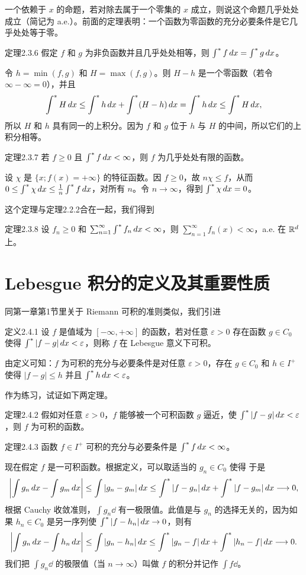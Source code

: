 一个依赖于 $x$ 的命题，若对除去属于一个零集的 $x$ 成立，则说这个命题几乎处处成立（简记为 a.e.）。前面的定理表明：一个函数为零函数的充分必要条件是它几乎处处等于零。
\begin{statement}{定理}{2.3.6}
假定 $f$ 和 $g$ 为非负函数并且几乎处处相等，则 $\int^{*} f\,dx=\int^{*} g\,dx$。
\end{statement}
\Proof 令 $h=\min(f,g)$ 和 $H=\max(f,g)$。则 $H-h$ 是一个零函数（若令 $\infty-\infty=0$），并且
\[\int^{*} H\,dx\le\int^{*} h\,dx+\int^{*}(H-h)\,dx=\int^{*} h\,dx\le\int^{*} H\,dx,\]
所以 $H$ 和 $h$ 具有同一的上积分。因为 $f$ 和 $g$ 位于 $h$ 与 $H$ 的中间，所以它们的上积分相等。
\begin{statement}{定理}{2.3.7}
若 $f\ge0$ 且 $\int^{*} f\,dx<\infty$，则 $f$ 为几乎处处有限的函数。
\end{statement}
\Proof 设 $\chi$ 是 $\{x;f(x)=+\infty\}$ 的特征函数。因 $f\ge0$，故
$n\chi\le f$，从而 $0\le\int^{*}\chi\,dx\le\frac1n\int^{*} f\,dx$，对所有 $n$。令 $n\to\infty$，得到 $\int^{*}\chi\,dx=0$。

这个定理与定理2.2.2合在一起，我们得到
\begin{statement}{定理}{2.3.8}
设 $f_n\ge0$ 和 $\sum_{n=1}^\infty\int^{*} f_n\,dx<\infty$，则 $\sum_{n=1}^\infty f_n(x)<\infty$，a.e. 在 $\mathbb R^d$ 上。
\end{statement}
\section{Lebesgue 积分的定义及其重要性质}
同第一章第1节里关于 Riemann 可积的准则类似，我们引进
\begin{statement}{定义}{2.4.1}
设 $f$ 是值域为 $[-\infty,+\infty]$ 的函数，若对任意 $\varepsilon>0$ 存在函数 $g\in C_0$ 使得 $\int^{*}|f-g|\,dx<\varepsilon$，则称 $f$ 在 Lebesgue 意义下可积。
\end{statement}
由定义可知：$f$ 为可积的充分与必要条件是对任意 $\varepsilon>0$，存在 $g\in C_0$ 和 $h\in I^+$ 使得 $|f-g|\le h$ 并且 $\int^{*} h\,dx<\varepsilon$。

作为练习，试证如下两定理。
\begin{statement}{定理}{2.4.2}
假如对任意 $\varepsilon>0$，$f$ 能够被一个可积函数 $g$ 逼近，使 $\int^{*}|f-g|\,dx<\varepsilon$，则 $f$ 为可积的函数。
\end{statement}
\begin{statement}{定理}{2.4.3}
函数 $f\in I^+$ 可积的充分与必要条件是 $\int^{*} f\,dx<\infty$。
\end{statement}
现在假定 $f$ 是一可积函数。根据定义，可以取适当的 $g_n\in C_0$ 使得
于是
\[\left|\int g_n\,dx-\int g_m\,dx\right|\le\int|g_n-g_m|\,dx\le\int^{*}|f-g_n|\,dx+\int^{*}|f-g_m|\,dx\longrightarrow0,\]
根据 Cauchy 收敛准则，$\int g_n\dd$ 有一极限值。此值是与 $g_n$ 的选择无关的，因为如果 $h_n\in C_0$ 是另一序列使 $\int^{*}|f-h_n|\,dx\to0$，则有
\[\left|\int g_n\,dx-\int h_n\,dx\right|\le\int|g_n-h_n|\,dx\le\int^{*}|g_n-f|\,dx+\int^{*}|h_n-f|\,dx\longrightarrow0.\]
我们把 $\int g_n\dd$ 的极限值（当 $n\to\infty$）叫做 $f$ 的积分并记作 $\int f\dd$。

